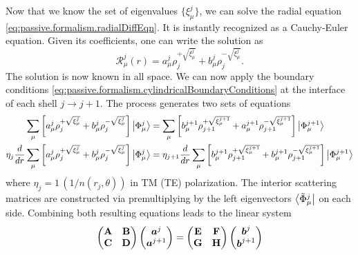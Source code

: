 Now that we know the set of eigenvalues $\{\xi_\mu^j\}$, we can solve the radial
equation \eqref{eq:passive.formalism.radialDiffEqn}. It is instantly recognized as 
a Cauchy-Euler equation. Given its coefficients, one can write the solution 
as \cite[p.~118-119]{GRE98}
  \begin{equation}
    \label{eq:sMatrix.radialSolution}
    \mathcal{R}_\mu^j(r) =  a_\mu^j\rho_j^{+\sqrt{\xi_\mu^j}}+b_\mu^j\rho_j^{-\sqrt{\xi_\mu^j}}.
  \end{equation}
The solution is now known in all space. We can now apply the boundary conditions \eqref{eq:passive.formalism.cylindricalBoundaryConditions}
at the interface of each shell $j\rightarrow j+1$. The process generates two sets of equations
  \begin{subequations}
  \begin{align}
   \sum_\mu\left[a_\mu^j\rho_j^{+\sqrt{\xi_\mu^j}}+b_\mu^j\rho_j^{-\sqrt{\xi_\mu^j}}\right]\Ket{\Phi_\mu^j}
   &=
   \sum_\mu\left[b_\mu^{j+1}\rho_{j+1}^{+\sqrt{\xi_\mu^{j+1}}}+a_\mu^{j+1}\rho_{j+1}^{-\sqrt{\xi_\mu^{j+1}}}\right]\Ket{\Phi_\mu^{j+1}}	\\
   \eta_j\frac{d}{dr}\sum_\mu\left[a_\mu^j\rho_j^{+\sqrt{\xi_\mu^j}}+b_\mu^j\rho_j^{-\sqrt{\xi_\mu^j}}\right]\Ket{\Phi_\mu^j}
   &=
   \eta_{j+1}\frac{d}{dr}\sum_\mu\left[b_\mu^{j+1}\rho_{j+1}^{+\sqrt{\xi_\mu^{j+1}}}+b_\mu^{j+1}\rho_{j+1}^{-\sqrt{\xi_\mu^{j+1}}}\right]\Ket{\Phi_\mu^{j+1}}
  \end{align}
  \end{subequations}
where $\eta_j = 1\, (1/n(r_j,\theta))$ in TM (TE) polarization. The interior scattering matrices
are constructed via premultiplying by the left eigenvectors $\Bra{\tilde{\Phi}_\mu^j}$ on each side. 
Combining both resulting equations leads to the linear system 
  \begin{equation}
    \begin{pmatrix}\mathbf{A} & \mathbf{B} \\ \mathbf{C} & \mathbf{D} \end{pmatrix} \begin{pmatrix} \boldsymbol{a}^j \\ \boldsymbol{a}^{j+1}\end{pmatrix}
    =
    \begin{pmatrix}\mathbf{E} & \mathbf{F} \\ \mathbf{G} & \mathbf{H} \end{pmatrix} \begin{pmatrix} \boldsymbol{b}^j \\ \boldsymbol{b}^{j+1}\end{pmatrix}
  \end{equation}
